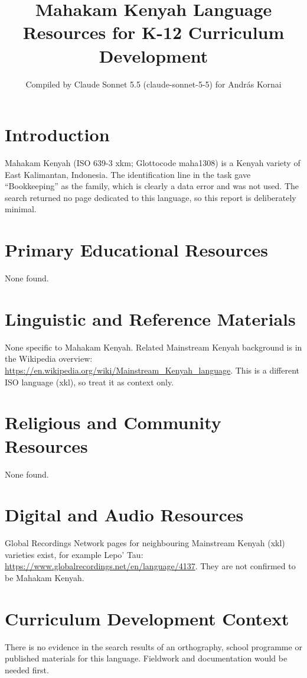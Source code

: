 \documentclass[12pt]{article}
\title{Mahakam Kenyah Language Resources for K-12 Curriculum Development}
\author{Compiled by Claude Sonnet 5.5 (claude-sonnet-5-5) for Andr\'as Kornai}
\date{}
\begin{document}
\maketitle

\section{Introduction}
Mahakam Kenyah (ISO 639-3 xkm; Glottocode maha1308) is a Kenyah variety of East Kalimantan, Indonesia. The identification line in the task gave ``Bookkeeping'' as the family, which is clearly a data error and was not used. The search returned no page dedicated to this language, so this report is deliberately minimal.

\section{Primary Educational Resources}
None found.

\section{Linguistic and Reference Materials}
None specific to Mahakam Kenyah. Related Mainstream Kenyah background is in the Wikipedia overview: \url{https://en.wikipedia.org/wiki/Mainstream_Kenyah_language}. This is a different ISO language (xkl), so treat it as context only.

\section{Religious and Community Resources}
None found.

\section{Digital and Audio Resources}
Global Recordings Network pages for neighbouring Mainstream Kenyah (xkl) varieties exist, for example Lepo' Tau: \url{https://www.globalrecordings.net/en/language/4137}. They are not confirmed to be Mahakam Kenyah.

\section{Curriculum Development Context}
There is no evidence in the search results of an orthography, school programme or published materials for this language. Fieldwork and documentation would be needed first.
\end{document}
